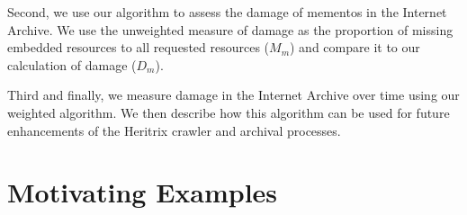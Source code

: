 Second, we use our algorithm to assess the damage of mementos in the Internet Archive. We use the unweighted measure of damage as the proportion of missing embedded resources to all requested resources ($M_m$) and compare it to our calculation of damage ($D_m$). %

Third and finally, we measure damage in the Internet Archive over time using our weighted algorithm. We then describe how this algorithm can be used for future enhancements of the Heritrix crawler \cite{Sigurosson:Incremental-Heritrix, heritrix} and archival processes.



\section{Motivating Examples}
\label{example}


